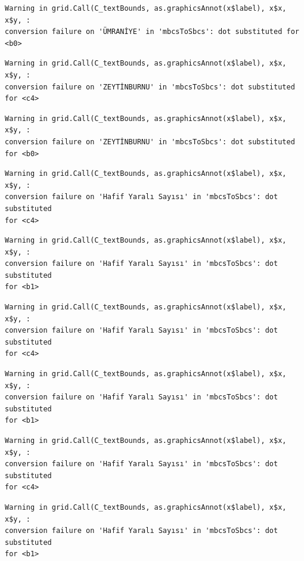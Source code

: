 \documentclass[
  11pt,
  a4paper,
  DIV=11,
  numbers=noendperiod]{scrartcl}
\begin{document}
\begin{verbatim}
Warning in grid.Call(C_textBounds, as.graphicsAnnot(x$label), x$x, x$y, :
conversion failure on 'ÜMRANİYE' in 'mbcsToSbcs': dot substituted for <b0>
\end{verbatim}

\begin{verbatim}
Warning in grid.Call(C_textBounds, as.graphicsAnnot(x$label), x$x, x$y, :
conversion failure on 'ZEYTİNBURNU' in 'mbcsToSbcs': dot substituted for <c4>
\end{verbatim}

\begin{verbatim}
Warning in grid.Call(C_textBounds, as.graphicsAnnot(x$label), x$x, x$y, :
conversion failure on 'ZEYTİNBURNU' in 'mbcsToSbcs': dot substituted for <b0>
\end{verbatim}

\begin{verbatim}
Warning in grid.Call(C_textBounds, as.graphicsAnnot(x$label), x$x, x$y, :
conversion failure on 'Hafif Yaralı Sayısı' in 'mbcsToSbcs': dot substituted
for <c4>
\end{verbatim}

\begin{verbatim}
Warning in grid.Call(C_textBounds, as.graphicsAnnot(x$label), x$x, x$y, :
conversion failure on 'Hafif Yaralı Sayısı' in 'mbcsToSbcs': dot substituted
for <b1>
\end{verbatim}

\begin{verbatim}
Warning in grid.Call(C_textBounds, as.graphicsAnnot(x$label), x$x, x$y, :
conversion failure on 'Hafif Yaralı Sayısı' in 'mbcsToSbcs': dot substituted
for <c4>
\end{verbatim}

\begin{verbatim}
Warning in grid.Call(C_textBounds, as.graphicsAnnot(x$label), x$x, x$y, :
conversion failure on 'Hafif Yaralı Sayısı' in 'mbcsToSbcs': dot substituted
for <b1>
\end{verbatim}

\begin{verbatim}
Warning in grid.Call(C_textBounds, as.graphicsAnnot(x$label), x$x, x$y, :
conversion failure on 'Hafif Yaralı Sayısı' in 'mbcsToSbcs': dot substituted
for <c4>
\end{verbatim}

\begin{verbatim}
Warning in grid.Call(C_textBounds, as.graphicsAnnot(x$label), x$x, x$y, :
conversion failure on 'Hafif Yaralı Sayısı' in 'mbcsToSbcs': dot substituted
for <b1>
\end{verbatim}
\end{document}
